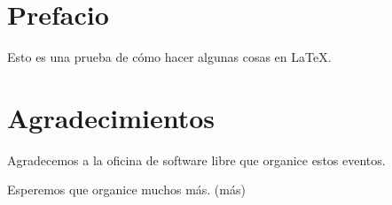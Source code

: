 
\chapter*{Prefacio}
Esto es una prueba de cómo hacer algunas cosas en LaTeX. 

\chapter*{Agradecimientos}
Agradecemos a la oficina de software libre que organice estos eventos.

Esperemos que organice muchos más. (m\'as)